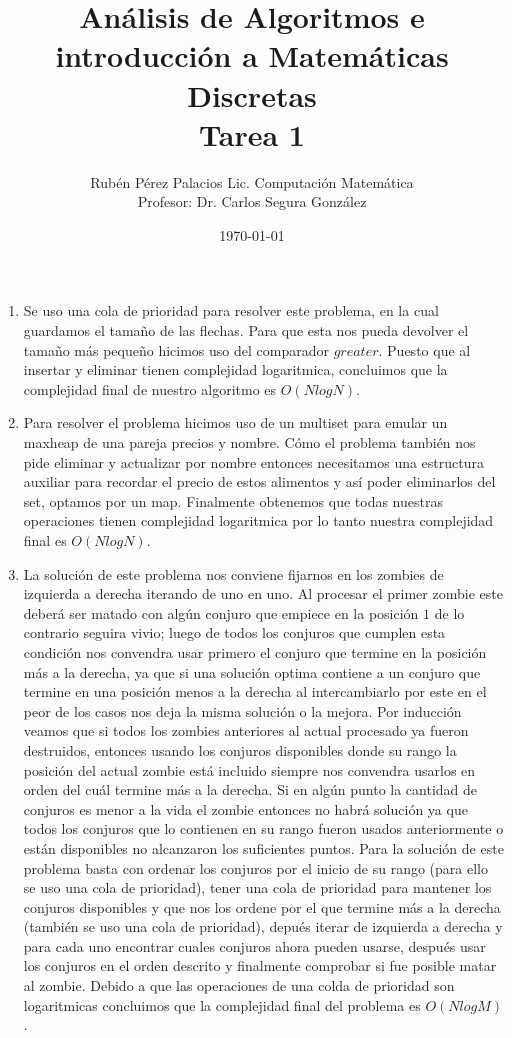 \documentclass[letterpaper]{article}
\title{Análisis de Algoritmos e introducción a Matemáticas Discretas \\ Tarea 1}
\author{Rubén Pérez Palacios Lic. Computación Matemática\\Profesor: Dr. Carlos Segura González}
\date{\today}
\theoremstyle{definition}
\theoremstyle{lemathm}
\theoremstyle{lemathm}
\theoremstyle{lemathm}
\theoremstyle{lemademthm}
\newcommand{\1}{\mathbbm{1}}
\begin{document}
	\maketitle

    \begin{enumerate}
        \item Se uso una cola de prioridad para resolver este problema, en la cual guardamos el tamaño de las flechas. Para que esta nos pueda devolver el tamaño más pequeño hicimos uso del comparador $greater$. Puesto que al insertar y eliminar tienen complejidad logaritmica, concluimos que la complejidad final de nuestro algoritmo es $O(NlogN)$.
        \item Para resolver el problema hicimos uso de un multiset para emular un maxheap de una pareja precios y nombre. Cómo el problema también nos pide eliminar y actualizar por nombre entonces necesitamos una estructura auxiliar para recordar el precio de estos alimentos y así poder eliminarlos del set, optamos por un map. Finalmente obtenemos que todas nuestras operaciones tienen complejidad logaritmica por lo tanto nuestra complejidad final es $O(NlogN)$.
        \item La solución de este problema nos conviene fijarnos en los zombies de izquierda a derecha iterando de uno en uno. Al procesar el primer zombie este deberá ser matado con algún conjuro que empiece en la posición $1$ de lo contrario seguira vivio; luego de todos los conjuros que cumplen esta condición nos convendra usar primero el conjuro que termine en la posición más a la derecha, ya que si una solución optima contiene a un conjuro que termine en una posición menos a la derecha al intercambiarlo por este en el peor de los casos nos deja la misma solución o la mejora. Por inducción veamos que si todos los zombies anteriores al actual procesado ya fueron destruidos, entonces usando los conjuros disponibles donde su rango la posición del actual zombie está incluido siempre nos convendra usarlos en orden del cuál termine más a la derecha. Si en algún punto la cantidad de conjuros es menor a la vida el zombie entonces no habrá solución ya que todos los conjuros que lo contienen en su rango fueron usados anteriormente o están disponibles no alcanzaron los suficientes puntos. Para la solución de este problema basta con ordenar los conjuros por el inicio de su rango (para ello se uso una cola de prioridad), tener una cola de prioridad para mantener los conjuros disponibles y que nos los ordene por el que termine más a la derecha (también se uso una cola de prioridad), depués iterar de izquierda a derecha y para cada uno encontrar cuales conjuros ahora pueden usarse, después usar los conjuros en el orden descrito y finalmente comprobar si fue posible matar al zombie. Debido a que las operaciones de una colda de prioridad son logaritmicas concluimos que la complejidad final del problema es $O(NlogM)$.
    \end{enumerate}
\end{document}
